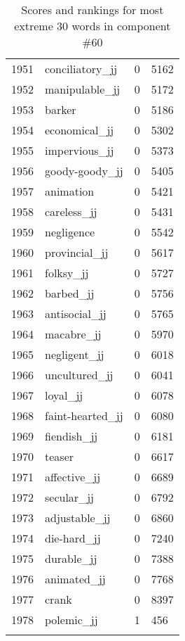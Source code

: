 \begin{longtable}[!htbp]{| rlr@{.}l |}
    1951 & conciliatory\_jj & 0 & 5162 \\
    1952 & manipulable\_jj & 0 & 5172 \\
    1953 & barker & 0 & 5186 \\
    1954 & economical\_jj & 0 & 5302 \\
    1955 & impervious\_jj & 0 & 5373 \\
    1956 & goody-goody\_jj & 0 & 5405 \\
    1957 & animation & 0 & 5421 \\
    1958 & careless\_jj & 0 & 5431 \\
    1959 & negligence & 0 & 5542 \\
    1960 & provincial\_jj & 0 & 5617 \\
    1961 & folksy\_jj & 0 & 5727 \\
    1962 & barbed\_jj & 0 & 5756 \\
    1963 & antisocial\_jj & 0 & 5765 \\
    1964 & macabre\_jj & 0 & 5970 \\
    1965 & negligent\_jj & 0 & 6018 \\
    1966 & uncultured\_jj & 0 & 6041 \\
    1967 & loyal\_jj & 0 & 6078 \\
    1968 & faint-hearted\_jj & 0 & 6080 \\
    1969 & fiendish\_jj & 0 & 6181 \\
    1970 & teaser & 0 & 6617 \\
    1971 & affective\_jj & 0 & 6689 \\
    1972 & secular\_jj & 0 & 6792 \\
    1973 & adjustable\_jj & 0 & 6860 \\
    1974 & die-hard\_jj & 0 & 7240 \\
    1975 & durable\_jj & 0 & 7388 \\
    1976 & animated\_jj & 0 & 7768 \\
    1977 & crank & 0 & 8397 \\
    1978 & polemic\_jj & 1 & 456 \\
    \hline
    \caption{Scores and rankings for most extreme 30 words in component \#60} \\
\end{longtable}
